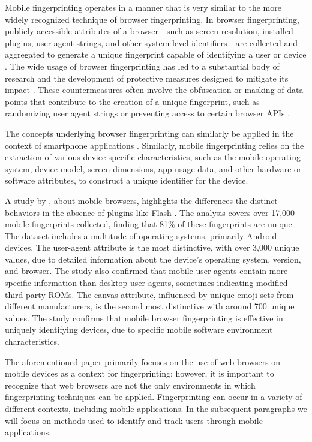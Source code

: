\documentclass[11pt,
  oneside,openany,    %
]{scrreprt}
\begin{document}
Mobile fingerprinting operates in a manner that is very similar to the more widely recognized technique of browser fingerprinting.
In browser fingerprinting, publicly accessible attributes of a browser - such as screen resolution, installed plugins, user agent strings, and other system-level identifiers - are collected and aggregated to generate a unique fingerprint capable of identifying a user or device \cite{DBLP:conf/ntms/UpathilakeLM15}.
The wide usage of browser fingerprinting has led to a substantial body of research and the development of protective measures designed to mitigate its impact \cite{DBLP:conf/secrypt/PolcakSMHM23}.
These countermeasures often involve the obfuscation or masking of data points that contribute to the creation of a unique fingerprint, such as randomizing user agent strings or preventing access to certain browser APIs \cite{DBLP:conf/secrypt/PolcakSMHM23, DBLP:conf/www/NikiforakisJL15, DBLP:conf/esorics/TorresJM15}.

The concepts underlying browser fingerprinting can similarly be applied in the context of smartphone applications \cite{DBLP:conf/IEEEares/PalfingerP20}. 
Similarly, mobile fingerprinting relies on the extraction of various device specific characteristics, such as the mobile operating system, device model, screen dimensions, app usage data, and other hardware or software attributes, to construct a unique identifier for the device.

A study by \citeauthor{DBLP:conf/www/Gomez-BoixLB18}, about mobile browsers, highlights the differences the distinct behaviors in the absence of plugins like Flash \cite{DBLP:conf/www/Gomez-BoixLB18}.
The analysis covers over 17,000 mobile fingerprints collected, finding that 81\% of these fingerprints are unique. 
The dataset includes a multitude of operating systems, primarily Android devices.
The user-agent attribute is the most distinctive, with over 3,000 unique values, due to detailed information about the device's operating system, version, and browser. 
The study also confirmed that mobile user-agents contain more specific information than desktop user-agents, sometimes indicating modified third-party ROMs.
The canvas attribute, influenced by unique emoji sets from different manufacturers, is the second most distinctive with around 700 unique values.
The study confirms that mobile browser fingerprinting is effective in uniquely identifying devices, due to specific mobile software environment characteristics.

The aforementioned paper primarily focuses on the use of web browsers on mobile devices as a context for fingerprinting; however, it is important to recognize that web browsers are not the only environments in which fingerprinting techniques can be applied.
Fingerprinting can occur in a variety of different contexts, including mobile applications.
In the subsequent paragraphs we will focus on methods used to identify and track users through mobile applications.
\end{document}

